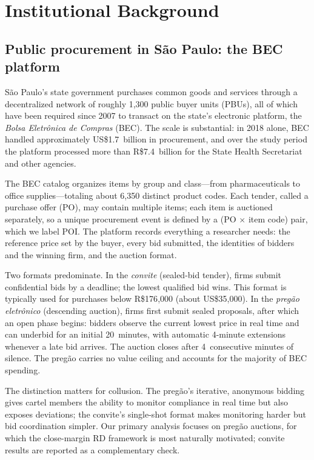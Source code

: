 \section{Institutional Background}\label{hist}

\subsection{Public procurement in S\~{a}o Paulo: the BEC platform}

S\~{a}o Paulo's state government purchases common goods and services through a decentralized network of roughly 1{,}300 public buyer units (PBUs), all of which have been required since 2007 to transact on the state's electronic platform, the \emph{Bolsa Eletr\^{o}nica de Compras} (BEC). The scale is substantial: in 2018 alone, BEC handled approximately US\$1.7~billion in procurement, and over the study period the platform processed more than R\$7.4~billion for the State Health Secretariat and other agencies.

The BEC catalog organizes items by group and class---from pharmaceuticals to office supplies---totaling about 6{,}350 distinct product codes. Each tender, called a purchase offer (PO), may contain multiple items; each item is auctioned separately, so a unique procurement event is defined by a (PO $\times$ item code) pair, which we label POI. The platform records everything a researcher needs: the reference price set by the buyer, every bid submitted, the identities of bidders and the winning firm, and the auction format.

Two formats predominate. In the \emph{convite} (sealed-bid tender), firms submit confidential bids by a deadline; the lowest qualified bid wins. This format is typically used for purchases below R\$176{,}000 (about US\$35{,}000). In the \emph{preg\~{a}o eletr\^{o}nico} (descending auction), firms first submit sealed proposals, after which an open phase begins: bidders observe the current lowest price in real time and can underbid for an initial 20~minutes, with automatic 4-minute extensions whenever a late bid arrives. The auction closes after 4~consecutive minutes of silence. The preg\~{a}o carries no value ceiling and accounts for the majority of BEC spending.

The distinction matters for collusion. The preg\~{a}o's iterative, anonymous bidding gives cartel members the ability to monitor compliance in real time but also exposes deviations; the convite's single-shot format makes monitoring harder but bid coordination simpler. Our primary analysis focuses on preg\~{a}o auctions, for which the close-margin RD framework is most naturally motivated; convite results are reported as a complementary check.

